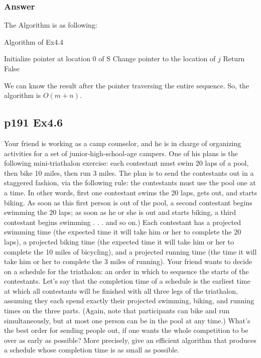\documentclass[a4paper]{article}
\begin{document}
\subsubsection*{Answer}
The Algorithm is as following:
\begin{algorithm}[!htb]
	\caption{Algorithm of Ex4.4}
	\begin{algorithmic}[1]
		\State Initialize pointer at location 0 of S
		\State Change pointer to the location of $j$
		\Else
		\State Return False
		\EndIf
		\EndFor\\
	\end{algorithmic}
\end{algorithm}
\par We can know the result after the pointer traversing the entire sequence. So, the algorithm is  $O(m + n)$.

\vspace{2cm}



\subsection*{p191 Ex4.6}
\begin{adjustwidth}{1cm}{1cm}
	Your friend is working as a camp counselor, and he is in charge of
	organizing activities for a set of junior-high-school-age campers. One of
	his plans is the following mini-triathalon exercise: each contestant must
	swim 20 laps of a pool, then bike 10 miles, then run 3 miles. The plan is
	to send the contestants out in a staggered fashion, via the following rule:
	the contestants must use the pool one at a time. In other words, first one
	contestant swims the 20 laps, gets out, and starts biking. As soon as this
	first person is out of the pool, a second contestant begins swimming the
	20 laps; as soon as he or she is out and starts biking, a third contestant
	begins swimming . . . and so on.)
	Each contestant has a projected swimming time (the expected time it
	will take him or her to complete the 20 laps), a projected biking time (the
	expected time it will take him or her to complete the 10 miles of bicycling),
	and a projected running time (the time it will take him or her to complete
	the 3 miles of running). Your friend wants to decide on a schedule for the
	triathalon: an order in which to sequence the starts of the contestants.
	Let’s say that the completion time of a schedule is the earliest time at
	which all contestants will be finished with all three legs of the triathalon,
	assuming they each spend exactly their projected swimming, biking, and
	running times on the three parts. (Again, note that participants can bike
	and run simultaneously, but at most one person can be in the pool at
	any time.) What’s the best order for sending people out, if one wants the
	whole competition to be over as early as possible? More precisely, give
	an efficient algorithm that produces a schedule whose completion time
	is as small as possible.

\end{adjustwidth}
\end{document}
